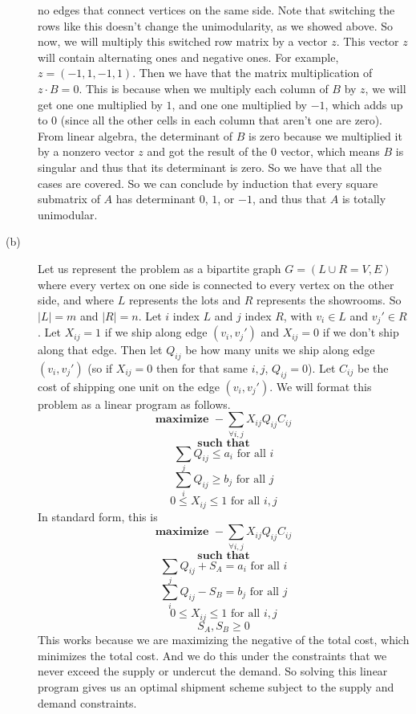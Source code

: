 \documentclass{article}
\begin{document}
\begin{description}
        no edges that connect vertices on the same side. Note that switching the
        rows like this doesn't change the unimodularity, as we showed above.
        So now, we will multiply this switched row matrix by a vector $z$. This
        vector $z$ will contain alternating ones and negative ones. For example,
        $z = (-1, 1, -1, 1)$. Then we have that the matrix multiplication of $z
        \cdot B = 0$. This is because when we multiply each column of $B$ by
        $z$, we will get one one multiplied by $1$, and one one multiplied by
        $-1$, which adds up to $0$ (since all the other cells in each column
        that aren't one are zero). From linear algebra, the determinant of $B$
        is zero because we multiplied it by a nonzero vector $z$ and got the
        result of the $0$ vector, which means $B$ is singular and thus that its determinant
        is zero. So we have that all the cases are covered. So we can
        conclude by induction that every square submatrix of $A$ has determinant
        $0$, $1$, or $-1$, and thus that $A$ is totally unimodular.
    \item[(b)]
        Let us represent the problem as a bipartite graph
        $G = (L \cup R = V, E)$ where every vertex on one side is connected to
        every vertex on the other side, and where $L$ represents the lots and $R$
        represents the showrooms. So $|L| = m$ and $|R| = n$.
        Let $i$ index $L$ and $j$ index $R$, with $v_i
        \in L$ and $v_j' \in R$. Let $X_{ij} = 1$ if we ship along edge $(v_i,
        v_j')$ and $X_{ij} = 0$ if we don't ship along that edge. Then let
        $Q_{ij}$ be how many units we ship along edge $(v_i, v_j')$ (so if
        $X_{ij} = 0$ then for that same $i,j$, $Q_{ij} = 0$).
        Let $C_{ij}$ be the cost of shipping one unit on the edge $(v_i, v_j')$.
        We will format this problem as a linear program as follows.
        \[ \textbf{maximize } -\sum_{\forall i,j} X_{ij} Q_{ij} C_{ij} \]
        \[ \textbf{such that} \]
        \[ \sum_j Q_{ij} \leq a_i \text{ for all $i$} \]
        \[ \sum_i Q_{ij} \geq b_j \text{ for all $j$} \]
        \[ 0 \le X_{ij} \le 1 \text{ for all $i,j$} \]
        In standard form, this is
        \[ \textbf{maximize } -\sum_{\forall i,j} X_{ij} Q_{ij} C_{ij} \]
        \[ \textbf{such that} \]
        \[ \sum_j Q_{ij} + S_A = a_i \text{ for all $i$} \]
        \[ \sum_i Q_{ij} - S_B = b_j \text{ for all $j$} \]
        \[ 0 \le X_{ij} \le 1 \text{ for all $i,j$} \]
        \[ S_A, S_B \ge 0 \]
        This works because we are maximizing the negative of the total cost,
        which minimizes the total cost. And we do this under the constraints
        that we never exceed the supply or undercut the demand. So solving this
        linear program gives us an optimal shipment scheme subject to the supply
        and demand constraints.


\end{description}
\end{document}
